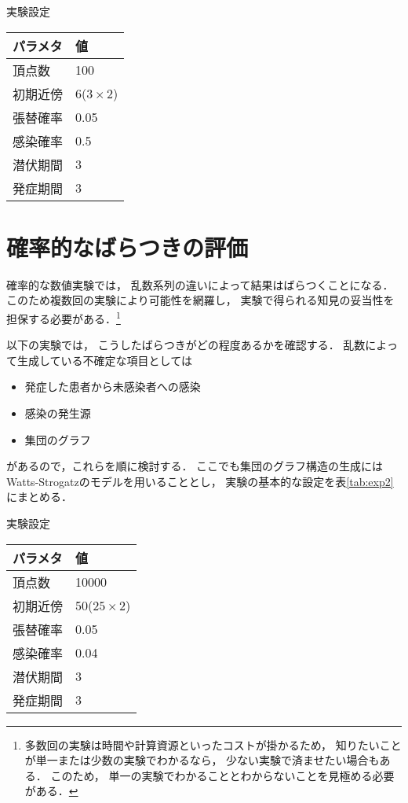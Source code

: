 \documentclass[10pt,oneside]{scrartcl}
\begin{document}
\begin{margintable}
  \caption{実験設定}
  \label{tab:exp1}
  \small
  \begin{tabular}{ll}
    \toprule
    パラメタ&値 \\
    \midrule
    頂点数&100 \\
    初期近傍&6\;($3\times2$) \\
    張替確率&0.05 \\
    感染確率&0.5 \\
    潜伏期間&3 \\
    発症期間&3 \\
    \bottomrule
  \end{tabular}
\end{margintable}

\section{確率的なばらつきの評価}
\label{sec:orgbf07337}

確率的な数値実験では，
乱数系列の違いによって結果はばらつくことになる．
このため複数回の実験により可能性を網羅し，
実験で得られる知見の妥当性を担保する必要がある．\footnote{多数回の実験は時間や計算資源といったコストが掛かるため，
知りたいことが単一または少数の実験でわかるなら，
少ない実験で済ませたい場合もある．
このため，
単一の実験でわかることとわからないことを見極める必要がある．}

以下の実験では，
こうしたばらつきがどの程度あるかを確認する．
乱数によって生成している不確定な項目としては
\begin{itemize}
\item 発症した患者から未感染者への感染
\item 感染の発生源
\item 集団のグラフ
\end{itemize}
があるので，これらを順に検討する．
ここでも集団のグラフ構造の生成には
Watts-Strogatzのモデルを用いることとし，
実験の基本的な設定を表\ref{tab:exp2}にまとめる．

\begin{margintable}
  \caption{実験設定}
  \label{tab:exp2}
  \small
  \begin{tabular}{ll}
    \toprule
    パラメタ&値 \\
    \midrule
    頂点数&10000 \\
    初期近傍&50\;($25\times2$) \\
    張替確率&0.05 \\
    感染確率&0.04 \\
    潜伏期間&3 \\
    発症期間&3 \\
    \bottomrule
  \end{tabular}
\end{margintable}
\end{document}
